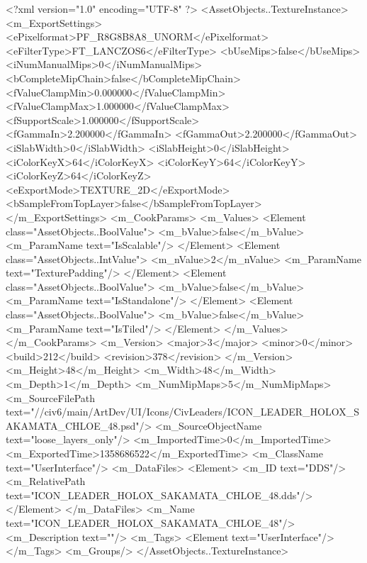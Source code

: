 <?xml version="1.0" encoding="UTF-8" ?>
<AssetObjects..TextureInstance>
	<m_ExportSettings>
		<ePixelformat>PF_R8G8B8A8_UNORM</ePixelformat>
		<eFilterType>FT_LANCZOS6</eFilterType>
		<bUseMips>false</bUseMips>
		<iNumManualMips>0</iNumManualMips>
		<bCompleteMipChain>false</bCompleteMipChain>
		<fValueClampMin>0.000000</fValueClampMin>
		<fValueClampMax>1.000000</fValueClampMax>
		<fSupportScale>1.000000</fSupportScale>
		<fGammaIn>2.200000</fGammaIn>
		<fGammaOut>2.200000</fGammaOut>
		<iSlabWidth>0</iSlabWidth>
		<iSlabHeight>0</iSlabHeight>
		<iColorKeyX>64</iColorKeyX>
		<iColorKeyY>64</iColorKeyY>
		<iColorKeyZ>64</iColorKeyZ>
		<eExportMode>TEXTURE_2D</eExportMode>
		<bSampleFromTopLayer>false</bSampleFromTopLayer>
	</m_ExportSettings>
	<m_CookParams>
		<m_Values>
			<Element class="AssetObjects..BoolValue">
				<m_bValue>false</m_bValue>
				<m_ParamName text="IsScalable"/>
			</Element>
			<Element class="AssetObjects..IntValue">
				<m_nValue>2</m_nValue>
				<m_ParamName text="TexturePadding"/>
			</Element>
			<Element class="AssetObjects..BoolValue">
				<m_bValue>false</m_bValue>
				<m_ParamName text="IsStandalone"/>
			</Element>
			<Element class="AssetObjects..BoolValue">
				<m_bValue>false</m_bValue>
				<m_ParamName text="IsTiled"/>
			</Element>
		</m_Values>
	</m_CookParams>
	<m_Version>
		<major>3</major>
		<minor>0</minor>
		<build>212</build>
		<revision>378</revision>
	</m_Version>
	<m_Height>48</m_Height>
	<m_Width>48</m_Width>
	<m_Depth>1</m_Depth>
	<m_NumMipMaps>5</m_NumMipMaps>
	<m_SourceFilePath text="//civ6/main/ArtDev/UI/Icons/CivLeaders/ICON_LEADER_HOLOX_SAKAMATA_CHLOE_48.psd"/>
	<m_SourceObjectName text="loose_layers_only"/>
	<m_ImportedTime>0</m_ImportedTime>
	<m_ExportedTime>1358686522</m_ExportedTime>
	<m_ClassName text="UserInterface"/>
	<m_DataFiles>
		<Element>
			<m_ID text="DDS"/>
			<m_RelativePath text="ICON_LEADER_HOLOX_SAKAMATA_CHLOE_48.dds"/>
		</Element>
	</m_DataFiles>
	<m_Name text="ICON_LEADER_HOLOX_SAKAMATA_CHLOE_48"/>
	<m_Description text=""/>
	<m_Tags>
		<Element text="UserInterface"/>
	</m_Tags>
	<m_Groups/>
</AssetObjects..TextureInstance>

